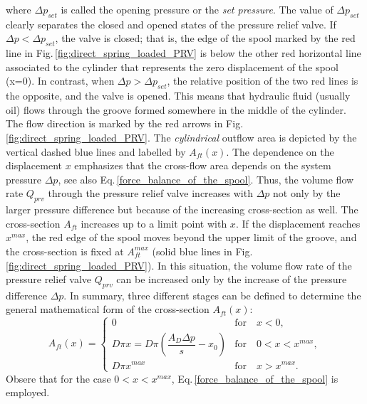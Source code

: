 where $\Delta p_{set}$ is called the opening pressure or the \textit{set pressure}. The value of $\Delta p_{set}$ clearly separates the closed and opened states of the pressure relief valve. If $\Delta p < \Delta p_{set}$, the valve is closed; that is, the edge of the spool marked by the red line in Fig.\,\ref{fig:direct_spring_loaded_PRV} is below the other red horizontal line associated to the cylinder that represents the zero displacement of the spool (x=0). In contrast, when $\Delta p > \Delta p_{set}$, the relative position of the two red lines is the opposite, and the valve is opened. This means that hydraulic fluid (usually oil) flows through the groove formed somewhere in the middle of the cylinder. The flow direction is marked by the red arrows in Fig.\,\ref{fig:direct_spring_loaded_PRV}. The \textit{cylindrical} outflow area is depicted by the vertical dashed blue lines and labelled by $A_{ft}(x)$. The dependence on the displacement $x$ emphasizes that the cross-flow area depends on the system pressure $\Delta p$, see also Eq.\,\eqref{force_balance_of_the_spool}. Thus, the volume flow rate $Q_{prv}$ through the pressure relief valve increases with $\Delta p$ not only by the larger pressure difference but because of the increasing cross-section as well. The cross-section $A_{ft}$ increases up to a limit point with $x$. If the displacement reaches $x^{max}$, the red edge of the spool moves beyond the upper limit of the groove, and the cross-section is fixed at $A_{ft}^{max}$ (solid blue lines in Fig.\,\ref{fig:direct_spring_loaded_PRV}). In this situation, the volume flow rate of the pressure relief valve $Q_{prv}$ can be increased only by the increase of the pressure difference $\Delta p$. In summary, three different stages can be defined to determine the general mathematical form of the cross-section $A_{ft}(x)$:
%
\begin{equation} \label{flow_cross_section_of_pressure_relief_valve}
A_{ft}(x) =
	\begin{cases}
		0 & \mathrm{for} \quad x<0, \\
		D \pi x = D \pi \left( \dfrac{A_D\Delta p}{s} - x_0 \right) & \mathrm{for} \quad 0<x<x^{max}, \\
		D \pi x^{max} & \mathrm{for} \quad x>x^{max}.
	\end{cases}
\end{equation}
%
Obsere that for the case $0<x<x^{max}$, Eq.\,\eqref{force_balance_of_the_spool} is employed.

